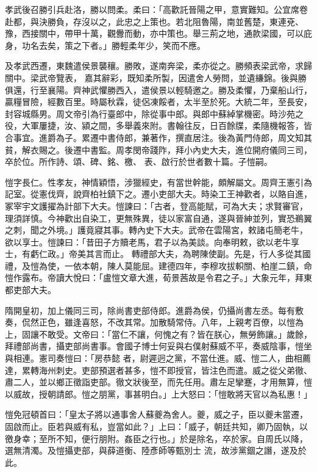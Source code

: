 \begin{pinyinscope}
 孝武後召勝引兵赴洛，勝以問柔。柔曰：「高歡託晉陽之甲，意實難知。公宜席卷赴都，與決勝負，存沒以之，此忠之上策也。若北阻魯陽，南並舊楚，東連兗、豫，西接關中，帶甲十萬，觀釁而動，亦中策也。舉三荊之地，通款梁國，可以庇身，功名去矣，策之下者。」勝輕柔年少，笑而不應。



 及孝武西遷，東魏遣侯景襲穰。勝敗，遂南奔梁，柔亦從之。勝頻表梁武帝，求歸關中。梁武帝覽表，
 嘉其辭彩，既知柔所製，因遣舍人勞問，並遺縑錦。後與勝俱還，行至襄陽。齊神武懼勝西入，遣侯景以輕騎邀之。勝及柔懼，乃棄船山行，贏糧冒險，經數百里。時屬秋霖，徒侶凍餒者，太半至於死。大統二年，至長安，封容城縣男。周文帝引為行臺郎中，除從事中郎。與郎中蘇綽掌機密。時沙苑之役，大軍屢捷，汝、潁之間，多舉義來附。書翰往反，日百餘牒，柔隨機報答，皆合事宜。進爵為子。累遷中書侍郎，兼著作，撰直居注。後為黃門侍郎，周文知其貧，解衣賜之。後遷中書監。周孝閔帝踐阼，拜小內史大夫，進位開府儀同三司，卒於位。所作詩、頌、碑、銘、檄、
 表、啟行於世者數十篇。子愷嗣。



 愷字長仁。性孝友，神情穎悟，涉獵經史，有當世幹能，頗解屬文。周齊王憲引為記室。從憲伐齊，說齊柏社鎮下之。遷小吏部大夫。時染工王神歡者，以賂自進，冢宰宇文護擢為計部下大夫。愷諫曰：「古者，登高能賦，可為大夫；求賢審官，理須詳慎。今神歡出自染工，更無殊異，徒以家富自通，遂與晉紳並列，實恐鵜翼之刺，聞之外境。」護竟寢其事。轉內史下大夫。武帝在雲陽宮，敕諸屯簡老牛，欲以享士。愷諫曰：「昔田子方贖老馬，君子以為美談。向奉明敕，欲以老牛享士，有虧仁政。」帝美其言而止。
 轉禮部大夫，為聘陳使副。先是，行人多從其國禮，及愷為使，一依本朝，陳人莫能屈。建德四年，李穆攻拔軹關、柏崖二鎮，命愷作露布。帝讀大悅曰：「盧愷文章大進，荀景茜故是令君之子。」大象元年，拜東都吏部大夫。



 隋開皇初，加上儀同三司，除尚書吏部侍郎。進爵為侯，仍攝尚書左丞。每有敷奏，侃然正色，雖逢喜怒，不改其常。加散騎常侍。八年，上親考百僚，以愷為上，固讓不敢受。文帝曰：「當仁不讓，何愧之有？皆在朕心，無勞飾讓。」歲餘，拜禮部尚書，攝吏部尚書事。會國子博士何妥與右僕射蘇威不平，奏威陰事，愷坐與相連。憲司奏愷曰：「房恭懿
 者，尉遲迥之黨，不當仕進。威、愷二人，曲相薦達，累轉海州刺史。吏部預選者甚多，愷不即授官，皆注色而遣。威之從父弟徹、肅二人，並以鄉正徵詣吏部。徹文狀後至，而先任用。肅左足攣蹇，才用無算，愷以威故，授朝請郎。愷之朋黨，事甚明白。」上大怒曰：「愷敢將天官以為私惠！」



 愷免冠頓首曰：「皇太子將以通事舍人蘇夔為舍人。夔，威之子，臣以夔未當遷，固啟而止。臣若與威有私，豈當如此？」上曰：「威子，朝廷共知，卿乃固執，以徼身幸；至所不知，便行朋附。姦臣之行也。」於是除名，卒於家。自周氏以降，選無清濁。及愷攝吏部，與薛道衡、陸彥師等甄別士
 流，故涉黨錮之譖，遂及於此。




\end{pinyinscope}
